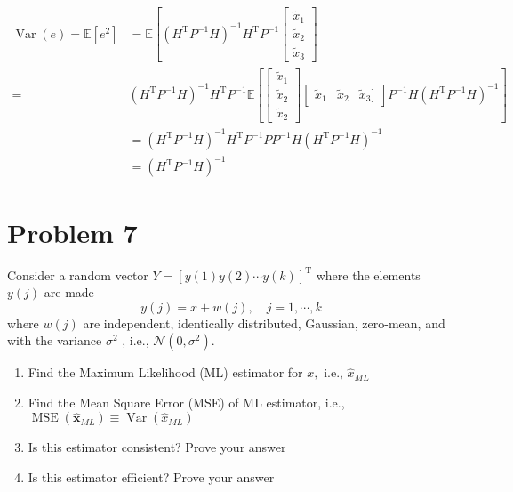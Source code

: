 \documentclass[10pt,a4paper,oneside]{article}
\begin{document}
\begin{enumerate}
\[\begin{aligned} \operatorname{Var}(e)=\mathbb{E}\left[e^{2}\right] &=\mathbb{E}\left[\left(H^{\mathrm{T}} P^{-1} H\right)^{-1} H^{\mathrm{T}} P^{-1}\left[\begin{array}{c}{\tilde{x}_{1}} \\ {\tilde{x}_{2}} \\ {\tilde{x}_{3}}\end{array}\right]\right.\\=&\left(H^{\mathrm{T}} P^{-1} H\right)^{-1} H^{\mathrm{T}} P^{-1} \mathbb{E}\left[\left[\begin{array}{c}{\tilde{x}_{1}} \\ {\tilde{x}_{2}} \\ {\tilde{x}_{2}}\end{array}\right]\left[\begin{array}{ccc}{\tilde{x}_{1}} & {\tilde{x}_{2}} & {\tilde{x}_{3} ]}\end{array}\right] P^{-1} H\left(H^{\mathrm{T}} P^{-1} H\right)^{-1}\right] \\ &=\left(H^{\mathrm{T}} P^{-1} H\right)^{-1} H^{\mathrm{T}} P^{-1} P P^{-1} H\left(H^{\mathrm{T}} P^{-1} H\right)^{-1} \\ &=\left(H^{\mathrm{T}} P^{-1} H\right)^{-1} \end{aligned}
\]
\end{enumerate}
\section* {Problem 7} 
Consider a random vector $Y=[y(1) y(2) \cdots y(k)]^{\mathrm{T}}$ where the elements $y(j)$ are made
\[
y(j)=x+w(j), \quad j=1, \cdots, k
\]
where $w(j)$ are independent, identically distributed, Gaussian, zero-mean, and with the variance $\sigma^{2}$ ,
i.e., $\mathcal{N}\left(0, \sigma^{2}\right) .$
\begin{enumerate}
	\item Find the Maximum Likelihood (ML) estimator for $x,$ i.e., $\hat{x}_{M L}$
	\item Find the Mean Square Error (MSE) of ML estimator, i.e., $\operatorname{MSE}\left(\hat{\mathbf{x}}_{M L}\right) \equiv \operatorname{Var}\left(\hat{x}_{M L}\right)$
	\item Is this estimator consistent? Prove your answer
	\item Is this estimator efficient? Prove your answer
\end{enumerate}
\end{document}
